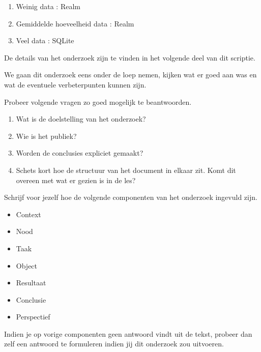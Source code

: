 \begin{displayquote}
  \begin{enumerate}
    \item Weinig data : Realm
    \item Gemiddelde hoeveelheid data : Realm
    \item Veel data : SQLite
  \end{enumerate}
  De details van het onderzoek zijn te vinden in het volgende deel van dit scriptie.
\end{displayquote}

We gaan dit onderzoek eens onder de loep nemen, kijken wat er goed aan was en wat de eventuele verbeterpunten kunnen zijn. 

\begin{exercise}
  Probeer volgende vragen zo goed mogelijk te beantwoorden.
  \begin{enumerate}
    \item Wat is de doelstelling van het onderzoek?
    \item Wie is het publiek?
    \item Worden de conclusies expliciet gemaakt? 
    \item Schets kort hoe de structuur van het document in elkaar zit. Komt dit overeen met wat er gezien is in de les?
  \end{enumerate}
\end{exercise}

\begin{exercise}
  Schrijf voor jezelf hoe de volgende componenten van het onderzoek ingevuld zijn.
  \begin{itemize}
    \item Context
    \item Nood
    \item Taak
    \item Object
    \item Resultaat
    \item Conclusie
    \item Perspectief
  \end{itemize}
  
  Indien je op vorige componenten geen antwoord vindt uit de tekst, probeer dan zelf een antwoord te formuleren indien jij dit onderzoek zou uitvoeren. 
\end{exercise}